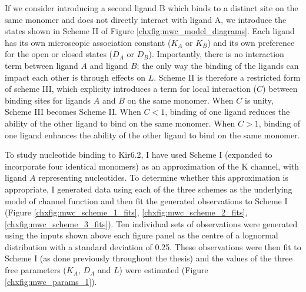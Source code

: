 If we consider introducing a second ligand B which binds to a distinct site on the same monomer and does not directly interact with ligand A, we introduce the states shown in Scheme II of Figure \ref{chxfig:mwc_model_diagrams}.
Each ligand has its own microscopic association constant ($K_A$ or $K_B$) and its own preference for the open or closed states ($D_A$ or $D_B$).
Importantly, there is no interaction term between ligand $A$ and ligand $B$; the only way the binding of the ligands can impact each other is through effects on $L$.
Scheme II is therefore a restricted form of scheme III, which explicity introduces a term for local interaction ($C$) between binding sites for ligands $A$ and $B$ on the same monomer.
When $C$ is unity, Scheme III becomes Scheme II.
When $C<1$, binding of one ligand reduces the ability of the other ligand to bind on the same monomer.
When $C>1$, binding of one ligand enhances the ability of the other ligand to bind on the same monomer.

To study nucleotide binding to Kir6.2, I have used Scheme I (expanded to incorporate four identical monomers) as an approximation of the K\ATP{} channel, with ligand $A$ representing nucleotides.
To determine whether this approximation is appropriate, I generated data using each of the three schemes as the underlying model of channel function and then fit the generated observations to Scheme I (Figure \ref{chxfig:mwc_scheme_1_fits}, \ref{chxfig:mwc_scheme_2_fits}, \ref{chxfig:mwc_scheme_3_fits}).
Ten individual sets of observations were generated using the inputs shown above each figure panel as the centre of a lognormal distribution with a standard deviation of 0.25.
These observations were then fit to Scheme I (as done previously throughout the thesis) and the values of the three free parameters ($K_A$, $D_A$ and $L$) were estimated (Figure \ref{chxfig:mwc_params_1}).

